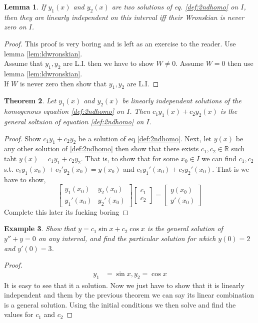 \documentclass[oneside,11pt,pdftex,final]{book}%
\numberwithin{equation}{section}
\newtheorem{theorem}{Theorem}[chapter]%
\newtheorem{lemma}[theorem]{Lemma}
\newtheorem{example}[theorem]{Example}
\numberwithin{section}{chapter}
\numberwithin{equation}{chapter}
\newcommand{\R}{\mathbb{R}}
\begin{document}
\begin{lemma}
	If $ y_1(x) $ and $ y_2(x) $ are two solutions of eq. \ref{def:2ndhomo} on $ I $, then they are linearly independent on this interval iff their Wronskian is never zero on $ I $.
\end{lemma}
\begin{proof}
	This proof is very boring and is left as an exercise to the reader. Use lemma \ref{lem:ldwronskian}.\\
	Assume that $ y_1, y_2 $ are L.I. then we have to show $ W \neq 0 $. Assume $ W=0 $ then use lemma \ref{lem:ldwronskian}.\\
	If $ W $ is never zero then show that $ y_1, y_2 $ are L.I.
\end{proof}

\begin{theorem}
	Let $ y_1(x) $ and $ y_2(x) $ be linearly independent solutions of the homogenous equation \ref{def:2ndhomo} on $ I $. Then $ c_1 y_1(x) + c_2 y_2 (x)$ is the general soltuion of equation \ref{def:2ndhomo} on $ I $.
\end{theorem}
\begin{proof}
	Show $ c_1 y_1+c_2y_2 $ be a solution of eq \ref{def:2ndhomo}. Next, let $ y(x) $ be any other solution of \ref{def:2ndhomo} then show that there exists $ c_1, c_2 \in \R $ such taht $ y(x)=c_1y_1+c_2y_2 $. That is, to show that for some $ x_0 \in I $ we can find $ c_1, c_2 $ s.t. $ c_1 y_1(x_0) +c_2'y_2(x_0)=y(x_0)$ and $ c_1y_1'(x_0)+c_2y_2'(x_0) $.
	That is we have to show,
	\[ \begin{bmatrix}
	y_1(x_0)	& y_2(x_0)\\ 
	y_1'(x_0)	& y_2'(x_0) 
	\end{bmatrix} \begin{bmatrix}
	c_1 \\ c_2
\end{bmatrix}=\begin{bmatrix}
y(x_0)\\ y'(x_0)
\end{bmatrix} \]
Complete this later its fucking boring
\end{proof}

\begin{example}
	Show that $ y=c_1 \sin x + c_2 \cos x $ is the general solution of $ y''+y=0 $ on any interval, and find the particular solution for which $ y(0)=2 $ and $ y'(0)=3$.
\end{example}
\begin{proof}
	\begin{align*}
		y_1&=\sin x, y_2= \cos x
	\end{align*}
It is easy to see that it a solution. Now we just have to show that it is linearly independent and them by the previous theorem we can say its linear combination is a general solution. Using the initial conditions we then solve and find the values for $ c_1 $ and $ c_2 $
\end{proof}
\end{document}
